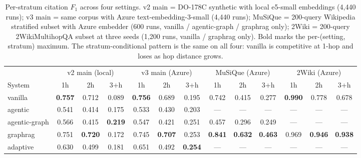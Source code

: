 \begin{table}[t]
  \centering
  \caption{Per-stratum citation $F_1$ across four settings. v2 main = DO-178C synthetic with local e5-small embeddings (4{,}440 runs); v3 main = same corpus with Azure text-embedding-3-small (4{,}440 runs); MuSiQue = 200-query Wikipedia stratified subset with Azure embedder (600 runs, vanilla / agentic-graph / graphrag only); 2Wiki = 200-query 2WikiMultihopQA subset at three seeds (1{,}200 runs, vanilla / graphrag only). Bold marks the per-(setting, stratum) maximum. The stratum-conditional pattern is the same on all four: vanilla is competitive at 1-hop and loses as hop distance grows.}
  \label{tab:dominance}
  \small
  \begin{tabular}{l ccc | ccc | ccc | ccc}
    \toprule
     & \multicolumn{3}{c|}{v2 main (local)} & \multicolumn{3}{c|}{v3 main (Azure)} & \multicolumn{3}{c|}{MuSiQue (Azure)} & \multicolumn{3}{c}{2Wiki (Azure)} \\
    System & 1h & 2h & 3+h & 1h & 2h & 3+h & 1h & 2h & 3+h & 1h & 2h & 3+h \\
    \midrule
    vanilla & \textbf{0.757} & 0.712 & 0.089 & \textbf{0.756} & 0.689 & 0.195 & 0.742 & 0.415 & 0.277 & \textbf{0.990} & 0.778 & 0.678 \\
    agentic & 0.541 & 0.414 & 0.175 & 0.533 & 0.430 & 0.203 & --- & --- & --- & --- & --- & --- \\
    agentic-graph & 0.566 & 0.415 & \textbf{0.219} & 0.547 & 0.421 & 0.251 & 0.457 & 0.296 & 0.249 & --- & --- & --- \\
    graphrag & 0.751 & \textbf{0.720} & 0.172 & 0.745 & \textbf{0.707} & 0.253 & \textbf{0.841} & \textbf{0.632} & \textbf{0.463} & 0.969 & \textbf{0.946} & \textbf{0.938} \\
    adaptive & 0.630 & 0.499 & 0.181 & 0.651 & 0.492 & \textbf{0.254} & --- & --- & --- & --- & --- & --- \\
    \bottomrule
  \end{tabular}
\end{table}
